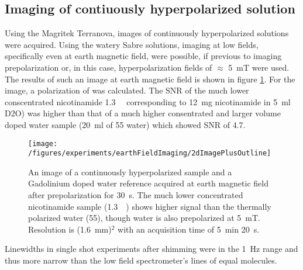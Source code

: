     \subsection{Imaging of contiuously hyperpolarized solution}
    Using the Magritek Terranova, images of continuously hyperpolarized solutions were acquired. Using the watery Sabre solutions, imaging at low fields, specifically even at earth magnetic field, were possible, if previous to imaging prepolarization or, in this case, hyperpolarization fields of $\approx$ \SI{5}{\milli\tesla} were used. The results of such an image at earth magnetic field is shown in figure \ref{fig:results:earthFieldImage}. For the image, a polarization of  was calculated. The SNR of the much lower conscentrated nicotinamide \SI{1.3}{\milli\Molar} corresponding to \SI{12}{\milli\gram} nicotinamide in \SI{5}{\milli\litre} D2O) was higher than that of a much higher consentrated and larger volume doped water sample (\SI{20}{\milli\litre} of \SI{55}{\Molar} water) which showed SNR of 4.7.  \begin{figure}
            \label{fig:results:earthFieldImage}
            \texttt{[image: /figures/experiments/earthFieldImaging/2dImagePlusOutline]}
            \caption[Earth field Sabre image]{An image of a continuously hyperpolarized sample and a Gadolinium doped water reference acquired at earth magnetic field after prepolarization for \SI{30}{\second}. The much lower concentrated nicotinamide sample (\SI{1.3}{\milli\Molar}) shows higher signal than the thermally polarized water (\SI{55}{\Molar}), though water is also prepolarized at \SI{5}{\milli\tesla}. Resolution is (\SI{1.6}{\milli\meter})$^2$ with an acquisition time of \SI{5}{\minute} \SI{20}{\second}.}
        \end{figure}
        Linewidths in single shot experiments after shimming were in the \SI{1}{\hertz} range and thus more narrow than the low field spectrometer's lines of equal molecules.
